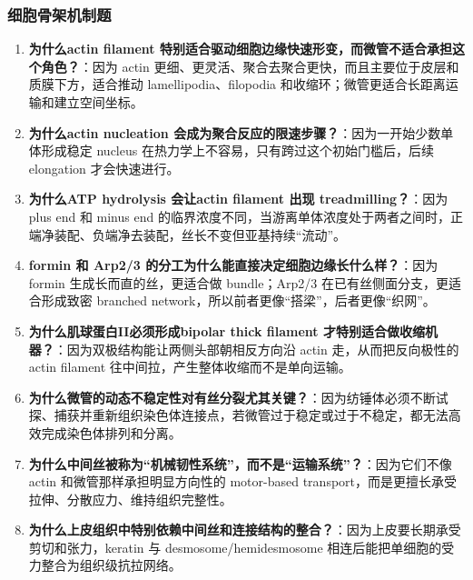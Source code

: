 \documentclass[12pt,fontset=none]{ctexart}
\begin{document}
\subsubsection*{细胞骨架机制题}
\begin{enumerate}
\item \textbf{为什么actin filament 特别适合驱动细胞边缘快速形变，而微管不适合承担这个角色？}：因为 actin 更细、更灵活、聚合去聚合更快，而且主要位于皮层和质膜下方，适合推动 lamellipodia、filopodia 和收缩环；微管更适合长距离运输和建立空间坐标。

\item \textbf{为什么actin nucleation 会成为聚合反应的限速步骤？}：因为一开始少数单体形成稳定 nucleus 在热力学上不容易，只有跨过这个初始门槛后，后续 elongation 才会快速进行。

\item \textbf{为什么ATP hydrolysis 会让actin filament 出现 treadmilling？}：因为 plus end 和 minus end 的临界浓度不同，当游离单体浓度处于两者之间时，正端净装配、负端净去装配，丝长不变但亚基持续“流动”。

\item \textbf{formin 和 Arp2/3 的分工为什么能直接决定细胞边缘长什么样？}：因为 formin 生成长而直的丝，更适合做 bundle；Arp2/3 在已有丝侧面分支，更适合形成致密 branched network，所以前者更像“搭梁”，后者更像“织网”。

\item \textbf{为什么肌球蛋白II必须形成bipolar thick filament 才特别适合做收缩机器？}：因为双极结构能让两侧头部朝相反方向沿 actin 走，从而把反向极性的 actin filament 往中间拉，产生整体收缩而不是单向运输。

\item \textbf{为什么微管的动态不稳定性对有丝分裂尤其关键？}：因为纺锤体必须不断试探、捕获并重新组织染色体连接点，若微管过于稳定或过于不稳定，都无法高效完成染色体排列和分离。

\item \textbf{为什么中间丝被称为“机械韧性系统”，而不是“运输系统”？}：因为它们不像 actin 和微管那样承担明显方向性的 motor-based transport，而是更擅长承受拉伸、分散应力、维持组织完整性。

\item \textbf{为什么上皮组织中特别依赖中间丝和连接结构的整合？}：因为上皮要长期承受剪切和张力，keratin 与 desmosome/hemidesmosome 相连后能把单细胞的受力整合为组织级抗拉网络。

\end{enumerate}
\end{document}
